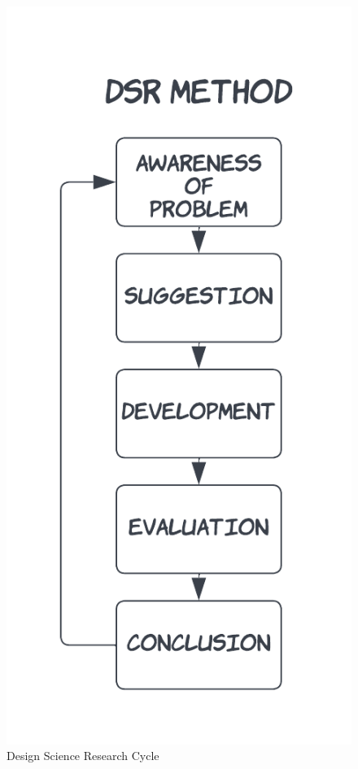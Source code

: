 \begin{figure}[ht]
    \centering
    \includegraphics[scale=0.15]{images/solution-ideas/DSRcycle.png}
    \caption{Design Science Research Cycle \cite{paper:designprinciple:vk}}
    \label{intro:fig:dps}
\end{figure}

